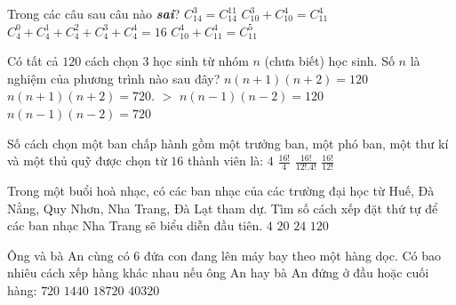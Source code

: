 \begin{ex}
	Trong các câu sau câu nào \textbf{\textit{sai}}?
	\choice
	{$C_{14}^3 = C_{14}^{11}$}
	{$C_{10}^3 + C_{10}^4 = C_{11}^4$}
	{$C_4^0 + C_4^1 + C_4^2 + C_4^3 + C_4^4 = 16$}
	{\True $C_{10}^4 + C_{11}^4 = C_{11}^5$}
\end{ex}

\begin{ex}
	Có tất cả $120$ cách chọn $3$ học sinh từ nhóm $n$ (chưa biết) học sinh. Số $n$ là nghiệm của phương trình nào sau đây?
	\choice
	{$n\left( {n + 1} \right)\left( {n + 2} \right) = 120$}
	{$n\left( {n + 1} \right)\left( {n + 2} \right) = 720$. $>$}
	{$n\left( {n - 1} \right)\left( {n - 2} \right) = 120$}
	{\True $n\left( {n - 1} \right)\left( {n - 2} \right) = 720$}
\end{ex}

\begin{ex}
	Số cách chọn một ban chấp hành gồm một trưởng ban, một phó ban, một thư kí và một thủ quỹ được chọn từ $16$ thành viên là:
	\choice
	{$4$}
	{$\frac{{16!}}{4}$}
	{$\frac{{16!}}{{12!.4!}}$}
	{\True $\frac{{16!}}{{12!}}$}
\end{ex}

\begin{ex}
	Trong một buổi hoà nhạc, có các ban nhạc của các trường đại học từ Huế, Đà Nằng, Quy Nhơn, Nha Trang, Đà Lạt tham dự. Tìm số cách xếp đặt thứ tự để các ban nhạc Nha Trang sẽ biểu diễn đầu tiên.
	\choice
	{$4$}
	{$20$}
	{\True $24$}
	{$120$}
\end{ex}

\begin{ex}
	Ông và bà An cùng có $6$ đứa con đang lên máy bay theo một hàng dọc. Có bao nhiêu cách xếp hàng khác nhau nếu ông An hay bà An đứng ở đầu hoặc cuối hàng:
	\choice
	{$720$}
	{$1440$}
	{\True $18720$}
	{$40320$}
\end{ex}

